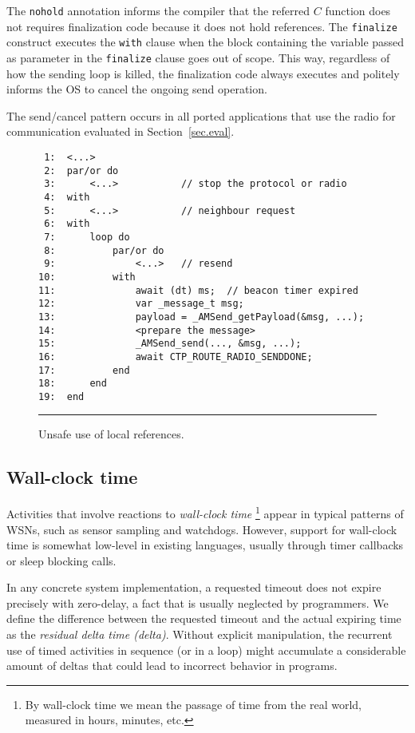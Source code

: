 \documentclass[10pt]{sensys-proc}
\newcommand{\code}[1] {{\small{\texttt{#1}}}}
\begin{document}
The \code{nohold} annotation informs the compiler that the referred $C$ 
function does not requires finalization code because it does not hold 
references.
The \code{finalize} construct executes the \code{with} clause when the block 
containing the variable passed as parameter in the \code{finalize} clause goes 
out of scope.
This way, regardless of how the sending loop is killed, the finalization code 
always executes and politely informs the OS to cancel the ongoing send 
operation.

The send/cancel pattern occurs in all ported applications that use the radio 
for communication evaluated in Section~\ref{sec.eval}.

\begin{figure}[t]
{\small
\begin{verbatim}
 1:  <...>
 2:  par/or do
 3:      <...>           // stop the protocol or radio
 4:  with
 5:      <...>           // neighbour request
 6:  with
 7:      loop do
 8:          par/or do
 9:              <...>   // resend
10:          with
11:              await (dt) ms;  // beacon timer expired
12:              var _message_t msg;
13:              payload = _AMSend_getPayload(&msg, ...);
14:              <prepare the message>
15:              _AMSend_send(..., &msg, ...);
16:              await CTP_ROUTE_RADIO_SENDDONE;
17:          end
18:      end
19:  end
\end{verbatim}
}
\rule{8.5cm}{0.37pt}
\caption{ Unsafe use of local references.
\label{lst.local}
}
\end{figure}

\subsection{Wall-clock time}
\label{sec.ceu.time}

Activities that involve reactions to \emph{wall-clock time}%
\footnote{
By wall-clock time we mean the passage of time from the real world, measured in 
hours, minutes, etc.
}
appear in typical patterns of WSNs, such as sensor sampling and watchdogs.
However, support for wall-clock time is somewhat low-level in existing 
languages, usually through timer callbacks or sleep blocking calls.

In any concrete system implementation, a requested timeout does not expire 
precisely with zero-delay, a fact that is usually neglected by programmers.
We define the difference between the requested timeout and the actual expiring 
time as the \emph{residual delta time (delta)}.
Without explicit manipulation, the recurrent use of timed activities in 
sequence (or in a loop) might accumulate a considerable amount of deltas that 
could lead to incorrect behavior in programs.
\end{document}
